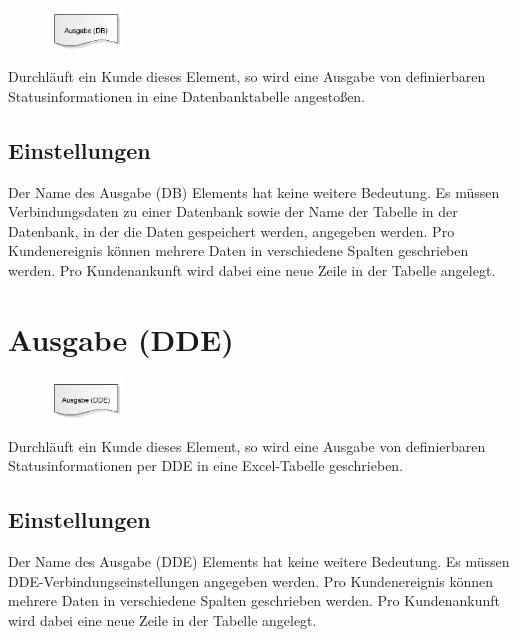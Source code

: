 \begin{figure}
\vspace{-22pt}
\includegraphics[width=2cm]{imageModelElementOutputDB.png}
\vspace{-22pt}
\end{figure}

Durchläuft ein Kunde dieses Element, so wird eine Ausgabe von definierbaren Statusinformationen in eine
Datenbanktabelle angestoßen.

\subsection*{Einstellungen}

Der Name des Ausgabe (DB) Elements hat keine weitere Bedeutung. Es müssen Verbindungsdaten zu einer
Datenbank sowie der Name der Tabelle in der Datenbank, in der die Daten gespeichert werden, angegeben werden.
Pro Kundenereignis können mehrere Daten in verschiedene Spalten geschrieben werden. Pro Kundenankunft
wird dabei eine neue Zeile in der Tabelle angelegt.


\section{Ausgabe (DDE)}
\label{ref:ModelElementOutputDDE}

\begin{figure}
\vspace{-22pt}
\includegraphics[width=2cm]{imageModelElementOutputDDE.png}
\vspace{-22pt}
\end{figure}

Durchläuft ein Kunde dieses Element, so wird eine Ausgabe von definierbaren Statusinformationen per
DDE in eine Excel-Tabelle geschrieben.

\subsection*{Einstellungen}

Der Name des Ausgabe (DDE) Elements hat keine weitere Bedeutung. Es müssen DDE-Verbindungseinstellungen
angegeben werden.
Pro Kundenereignis können mehrere Daten in verschiedene Spalten geschrieben werden. Pro Kundenankunft
wird dabei eine neue Zeile in der Tabelle angelegt.


